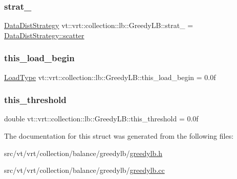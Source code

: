 \subsubsection{\texorpdfstring{strat\+\_\+}{strat\_}}
{\footnotesize\ttfamily \hyperlink{namespacevt_1_1vrt_1_1collection_1_1lb_a0c49bf89a59ba0fd5160bc3894417dfa}{Data\+Dist\+Strategy} vt\+::vrt\+::collection\+::lb\+::\+Greedy\+L\+B\+::strat\+\_\+ = \hyperlink{namespacevt_1_1vrt_1_1collection_1_1lb_a0c49bf89a59ba0fd5160bc3894417dfaa50894a237d9bcde0a18769af9a768baf}{Data\+Dist\+Strategy\+::scatter}\hspace{0.3cm}{\ttfamily [private]}}

\mbox{\label{structvt_1_1vrt_1_1collection_1_1lb_1_1_greedy_l_b_a95beecba794f8ac758242f1507a6d0ab}} 
\subsubsection{\texorpdfstring{this\+\_\+load\+\_\+begin}{this\_load\_begin}}
{\footnotesize\ttfamily \hyperlink{structvt_1_1vrt_1_1collection_1_1lb_1_1_base_l_b_a215e22b9f12678303f49615ae3be05cc}{Load\+Type} vt\+::vrt\+::collection\+::lb\+::\+Greedy\+L\+B\+::this\+\_\+load\+\_\+begin = 0.\+0f\hspace{0.3cm}{\ttfamily [private]}}

\mbox{\label{structvt_1_1vrt_1_1collection_1_1lb_1_1_greedy_l_b_afd457b0829f152767e1aa5b07d7652ef}} 
\subsubsection{\texorpdfstring{this\+\_\+threshold}{this\_threshold}}
{\footnotesize\ttfamily double vt\+::vrt\+::collection\+::lb\+::\+Greedy\+L\+B\+::this\+\_\+threshold = 0.\+0f\hspace{0.3cm}{\ttfamily [private]}}



The documentation for this struct was generated from the following files\+:\begin{DoxyCompactItemize}
\item 
src/vt/vrt/collection/balance/greedylb/\hyperlink{greedylb_8h}{greedylb.\+h}\item 
src/vt/vrt/collection/balance/greedylb/\hyperlink{greedylb_8cc}{greedylb.\+cc}\end{DoxyCompactItemize}
